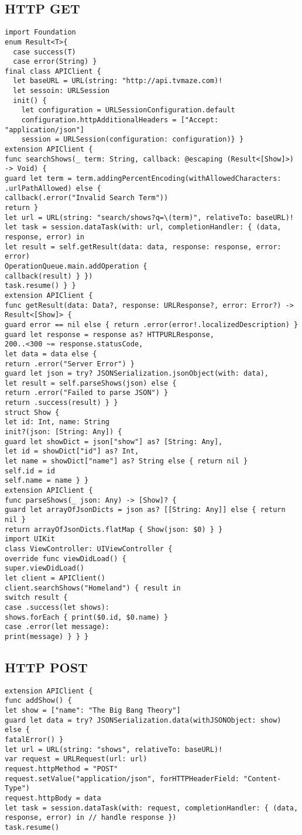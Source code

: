 \subsection{HTTP GET}
\begin{lstlisting}
import Foundation
enum Result<T>{
  case success(T)
  case error(String) }
final class APIClient {
  let baseURL = URL(string: "http://api.tvmaze.com)!
  let sessoin: URLSession
  init() {
    let configuration = URLSessionConfiguration.default
    configuration.httpAdditionalHeaders = ["Accept: "application/json"]
    session = URLSession(configuration: configuration)} }
extension APIClient {
func searchShows(_ term: String, callback: @escaping (Result<[Show]>) -> Void) {
guard let term = term.addingPercentEncoding(withAllowedCharacters: .urlPathAllowed) else {
callback(.error("Invalid Search Term"))
return }
let url = URL(string: "search/shows?q=\(term)", relativeTo: baseURL)!
let task = session.dataTask(with: url, completionHandler: { (data, response, error) in
let result = self.getResult(data: data, response: response, error: error)
OperationQueue.main.addOperation {
callback(result) } })
task.resume() } }
extension APIClient {
func getResult(data: Data?, response: URLResponse?, error: Error?) -> Result<[Show]> {
guard error == nil else { return .error(error!.localizedDescription) }
guard let response = response as? HTTPURLResponse,
200..<300 ~= response.statusCode,
let data = data else {
return .error("Server Error") }
guard let json = try? JSONSerialization.jsonObject(with: data),
let result = self.parseShows(json) else {
return .error("Failed to parse JSON") }
return .success(result) } }
struct Show {
let id: Int, name: String
init?(json: [String: Any]) {
guard let showDict = json["show"] as? [String: Any],
let id = showDict["id"] as? Int,
let name = showDict["name"] as? String else { return nil }
self.id = id
self.name = name } }
extension APIClient {
func parseShows(_ json: Any) -> [Show]? {
guard let arrayOfJsonDicts = json as? [[String: Any]] else { return nil }
return arrayOfJsonDicts.flatMap { Show(json: $0) } }
import UIKit
class ViewController: UIViewController {
override func viewDidLoad() {
super.viewDidLoad()
let client = APIClient()
client.searchShows("Homeland") { result in
switch result {
case .success(let shows):
shows.forEach { print($0.id, $0.name) }
case .error(let message):
print(message) } } }
\end{lstlisting}

\subsection{HTTP POST}
\begin{lstlisting}
extension APIClient {
func addShow() {
let show = ["name": "The Big Bang Theory"]
guard let data = try? JSONSerialization.data(withJSONObject: show) else {
fatalError() }
let url = URL(string: "shows", relativeTo: baseURL)!
var request = URLRequest(url: url)
request.httpMethod = "POST"
request.setValue("application/json", forHTTPHeaderField: "Content-Type")
request.httpBody = data
let task = session.dataTask(with: request, completionHandler: { (data, response, error) in // handle response })
task.resume()
\end{lstlisting}


